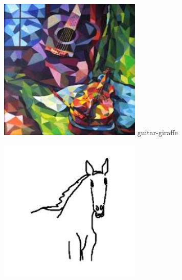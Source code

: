 \documentclass{article}
\begin{document}
\begin{center}
    \noindent
    \begin{minipage}{0.142\textwidth}
        \includegraphics[width=\linewidth]{./pic/misclassified_r3_p2_2723.jpg}
        guitar-giraffe
    \end{minipage}%
    \begin{minipage}{0.142\textwidth}
        \includegraphics[width=\linewidth]{./pic/misclassified_r4_p0_1641.jpg}

\end{minipage}
\end{center}
\end{document}
